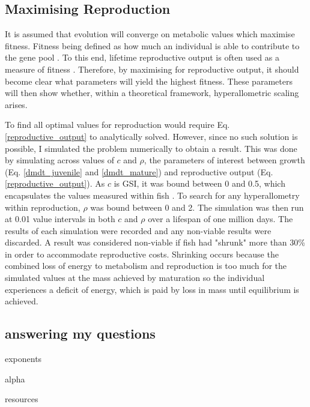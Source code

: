 \documentclass[a4paper, 11pt, hidelinks]{article} %
\begin{document}
	\subsection{Maximising Reproduction}
	It is assumed that evolution will converge on metabolic values which maximise fitness. 
	Fitness being defined as how much an individual is able to contribute to the gene pool \parencite{Speakman2008, Stearns2000}.  %
	To this end, lifetime reproductive output is often used as a measure of fitness \parencite{Charnov1991, Audzijonyte2018, Speakman2008, Stearns2000, Charnov2001, Tsoukali2016, Brown1993, Charnov2007}.  Therefore, by maximising for reproductive output, it should become clear what parameters will yield the highest fitness.  These parameters will then show whether, within a theoretical framework, hyperallometric scaling arises.
	
	To find all optimal values for reproduction would require Eq. \ref{reproductive_output} to analytically solved.  However, since no such solution is possible, I simulated the problem numerically to obtain a result.  This was done by simulating across values of $ c $ and $ \rho $, the parameters of interest between growth (Eq. \ref{dmdt_juvenile} and \ref{dmdt_mature}) and reproductive output (Eq. \ref{reproductive_output}).  As $ c $ is GSI, it was bound between 0 and 0.5, which encapsulates the values measured within fish \parencite{Benoit2018, Roff1983, Fontoura2009}.  To search for any hyperallometry within reproduction, $ \rho $ was bound between 0 and 2.  
	The simulation was then run at 0.01 value intervals in both $c$ and $\rho$ over a lifespan of one million days.  The results of each simulation were recorded and any non-viable results were discarded.  A result was considered non-viable if fish had "shrunk" more than 30\% in order to accommodate reproductive costs.  Shrinking occurs because  the combined loss of energy to metabolism and reproduction is too much for the simulated values at the mass achieved by maturation so the individual experiences a deficit of energy, which is paid by loss in mass until equilibrium is achieved.
	
	\subsection{answering my questions}

	exponents
	
	alpha
	
	resources
	
\end{document}
